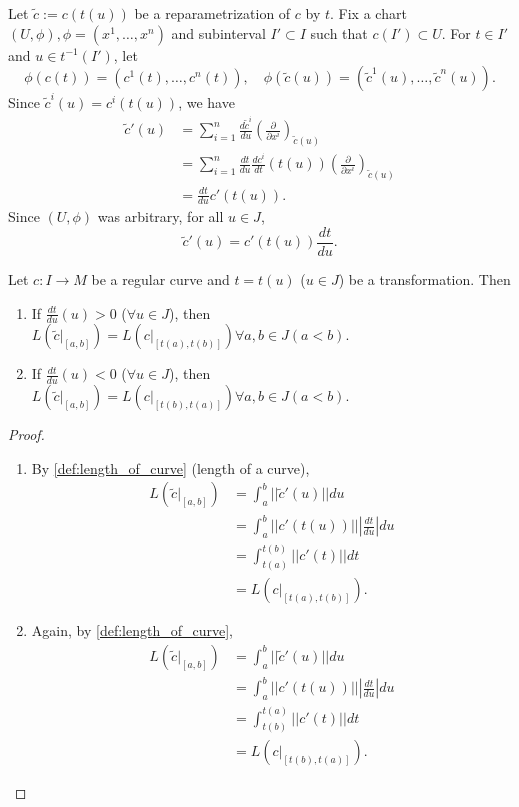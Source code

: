 Let $\tilde{c} := c(t(u))$ be a reparametrization of $c$ by $t$. Fix a chart $(U, \phi), \phi = (x^1, \dots, x^n)$ and subinterval $I'\subset I$ such that $c(I')\subset U$.
For $t \in I'$ and $u\in t^{-1}(I')$, let
\[
\phi(c(t)) = (c^1(t), \dots, c^n(t)), \quad \phi(\tilde{c}(u)) = (\tilde{c}^1(u), \dots, \tilde{c}^n(u)).
\]
Since $\tilde{c}^i(u) = c^i(t(u))$, we have
\[
\begin{aligned}
\tilde{c}'(u) &= \sum_{i=1}^n \frac{d\tilde{c}^i}{du}\left(\frac{\partial}{\partial x^i}\right)_{\tilde{c}(u)} \\
&= \sum_{i=1}^n \frac{dt}{du} \frac{dc^i}{dt}(t(u))\left(\frac{\partial}{\partial x^i}\right)_{\tilde{c}(u)}\\
&= \frac{dt}{du} c'(t(u)).
\end{aligned}
\]
Since $(U,\phi)$ was arbitrary, for all $u \in J$,
\[
\tilde{c}'(u) = c'(t(u))\frac{dt}{du}.
\]
\begin{proposition}
Let $c:I\to M$ be a regular curve and $t = t(u)$ ($u \in J$) be a transformation. Then
\begin{enumerate}[label=(\arabic*)]
\item If $\frac{dt}{du}(u) > 0 $ ($\forall u \in J$), then $L(\tilde{c}|_{[a,b]}) = L(c|_{[t(a),t(b)]}) \forall a,b \in J (a < b)$.
\item If $\frac{dt}{du}(u) < 0 $ ($\forall u \in J$), then $L(\tilde{c}|_{[a,b]}) = L(c|_{[t(b),t(a)]}) \forall a,b \in J (a < b)$.
\end{enumerate}
\end{proposition}
\begin{proof}
\begin{enumerate}[label=(\arabic*)]
\item By \autoref{def:length_of_curve} (length of a curve),
\[
\begin{aligned}
L(\tilde{c}|_{[a,b]}) &= \int^b_a ||\tilde{c}'(u)|| du \\
&= \int^b_a ||c'(t(u))|| \left|\frac{dt}{du}\right| du \\
&= \int^{t(b)}_{t(a)} ||c'(t)|| dt \\
&= L(c|_{[t(a),t(b)]}).
\end{aligned}
\]
\item Again, by \autoref{def:length_of_curve},
\[
\begin{aligned}
L(\tilde{c}|_{[a,b]}) &= \int^b_a ||\tilde{c}'(u)|| du \\
&= \int^b_a ||c'(t(u))|| \left|\frac{dt}{du}\right| du \\
&= \int^{t(a)}_{t(b)} ||c'(t)|| dt \\
&= L(c|_{[t(b),t(a)]}).
\end{aligned}
\]
\end{enumerate}
\end{proof}

